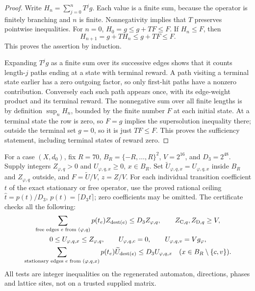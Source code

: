 \begin{proof}
Write \(H_n=\sum_{j=0}^nT^jg\). Each value is a finite sum,
because the operator is finitely branching and \(n\) is finite.
Nonnegativity implies that \(T\) preserves pointwise inequalities.
For \(n=0\), \(H_0=g\le g+TF\le F\). If \(H_n\le F\), then
\[
 H_{n+1}=g+TH_n\le g+TF\le F.
\]
This proves the assertion by induction.

Expanding \(T^jg\) as a finite sum over its successive edges
shows that it counts length-\(j\) paths ending at a state with
terminal reward. A path visiting a terminal state earlier has a
zero outgoing factor, so only first-hit paths have a nonzero
contribution. Conversely each such path appears once, with its
edge-weight product and its terminal reward. The nonnegative sum
over all finite lengths is by definition \(\sup_n H_n\), bounded
by the finite number \(F\) at each initial state. At a terminal
state the row is zero, so \(F=g\) implies the supersolution
inequality there; outside the terminal set \(g=0\), so it is just
\(TF\le F\). This proves the sufficiency statement, including
terminal states of reward zero.
\end{proof}

\begin{definition}\label{d:stationary-certificate}
For a case \((X,d_0)\), fix \(R=70\),
\(B_R=\{-R,\ldots,R\}^2\), \(V=2^{16}\), and \(D_3=2^{48}\).
Supply integers \(Z_{\varphi,q}>0\) and
\(U_{\varphi,q,x}\ge0\), \(x\in B_R\).
Set \(\widetilde U_{\varphi,q,x}=U_{\varphi,q,x}\) inside \(B_R\)
and \(Z_{\varphi,q}\) outside, and \(F=\widetilde U/V\), \(z=Z/V\).
For each individual transition coefficient \(t\) of the exact
stationary or free operator, use the proved rational ceiling
\(\widehat t=p(t)/D_3\), \(p(t)=\lceil D_3t\rceil\);
zero coefficients may be omitted.
The certificate checks all the following:
\[
 \begin{gathered}
 \sum_{\text{free edges }e\text{ from }(\varphi,q)}
       p(t_e)Z_{\operatorname{dest}(e)}
       \le D_3Z_{\varphi,q},\qquad Z_{{\rm C},q},Z_{{\rm D},q}\ge V,\\
 0\le U_{\varphi,q,x}\le Z_{\varphi,q},\qquad
 U_{\varphi,q,c}=0,\qquad U_{\varphi,q,v}=Vg_\varphi,\\
 \sum_{\text{stationary edges }e\text{ from }(\varphi,q,x)}
       p(t_e)\widetilde U_{\operatorname{dest}(e)}
       \le D_3 U_{\varphi,q,x}
       \quad(x\in B_R\setminus\{c,v\}).
 \end{gathered}
\]
All tests are integer inequalities on the regenerated automaton,
directions, phases and lattice sites, not on a trusted supplied matrix.
\end{definition}

